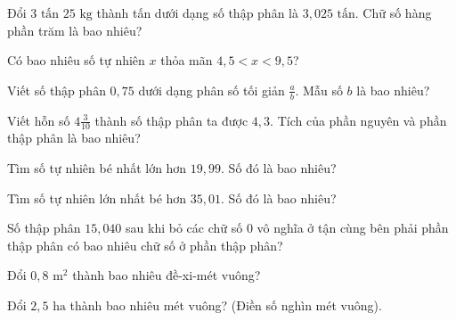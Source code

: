 \begin{ex}
  Đổi $3\text{ tấn } 25\text{ kg}$ thành tấn dưới dạng số thập phân là $3{,}025\text{ tấn}$. Chữ số hàng phần trăm là bao nhiêu?
\end{ex}

\begin{ex}
  Có bao nhiêu số tự nhiên $x$ thỏa mãn $4{,}5 < x < 9{,}5$?
\end{ex}

\begin{ex}
  Viết số thập phân $0{,}75$ dưới dạng phân số tối giản $\frac{a}{b}$. Mẫu số $b$ là bao nhiêu?
\end{ex}

\begin{ex}
  Viết hỗn số $4\frac{3}{10}$ thành số thập phân ta được $4{,}3$. Tích của phần nguyên và phần thập phân là bao nhiêu?
\end{ex}

\begin{ex}
  Tìm số tự nhiên bé nhất lớn hơn $19{,}99$. Số đó là bao nhiêu?
\end{ex}

\begin{ex}
  Tìm số tự nhiên lớn nhất bé hơn $35{,}01$. Số đó là bao nhiêu?
\end{ex}

\begin{ex}
  Số thập phân $15{,}040$ sau khi bỏ các chữ số 0 vô nghĩa ở tận cùng bên phải phần thập phân có bao nhiêu chữ số ở phần thập phân?
\end{ex}

\begin{ex}
  Đổi $0{,}8\text{ m}^2$ thành bao nhiêu đề-xi-mét vuông?
\end{ex}

\begin{ex}
  Đổi $2{,}5\text{ ha}$ thành bao nhiêu mét vuông? (Điền số nghìn mét vuông).
\end{ex}

